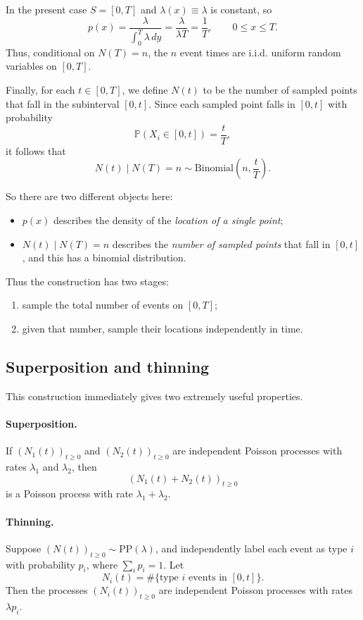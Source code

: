 \documentclass[11pt]{article}
\theoremstyle{definition}
\begin{document}
In the present case \(S=[0,T]\) and \(\lambda(x)\equiv \lambda\) is constant, so
\[
p(x)=\frac{\lambda}{\int_0^T \lambda\,dy}
=\frac{\lambda}{\lambda T}
=\frac1T,
\qquad 0\le x\le T.
\]
Thus, conditional on \(N(T)=n\), the \(n\) event times are i.i.d. uniform random variables on \( [0,T] \).

Finally, for each \(t\in[0,T]\), we define \(N(t)\) to be the number of sampled points that fall in the subinterval \( [0,t] \). Since each sampled point falls in \( [0,t] \) with probability
\[
\mathbb P(X_i\in[0,t])=\frac{t}{T},
\]
it follows that
\[
N(t)\mid N(T)=n \sim \mathrm{Binomial}\!\left(n,\frac{t}{T}\right).
\]

So there are two different objects here:
\begin{itemize}
    \item \(p(x)\) describes the density of the \emph{location of a single point};
    \item \(N(t)\mid N(T)=n\) describes the \emph{number of sampled points} that fall in \( [0,t] \), and this has a binomial distribution.
\end{itemize}

Thus the construction has two stages:
\begin{enumerate}[leftmargin=2em]
    \item sample the total number of events on \( [0,T] \);
    \item given that number, sample their locations independently in time.
\end{enumerate}

\subsection{Superposition and thinning}

This construction immediately gives two extremely useful properties.

\paragraph{Superposition.}
If $(N_1(t))_{t\ge 0}$ and $(N_2(t))_{t\ge 0}$ are independent Poisson processes with rates $\lambda_1$ and $\lambda_2$, then
\[
(N_1(t)+N_2(t))_{t\ge 0}
\]
is a Poisson process with rate $\lambda_1+\lambda_2$.

\paragraph{Thinning.}
Suppose $(N(t))_{t\ge 0}\sim \mathrm{PP}(\lambda)$, and independently label each event as type $i$ with probability $p_i$, where $\sum_i p_i=1$.
Let
\[
N_i(t)=\#\{\text{type }i\text{ events in }[0,t]\}.
\]
Then the processes $(N_i(t))_{t\ge 0}$ are independent Poisson processes with rates $\lambda p_i$.
\end{document}
